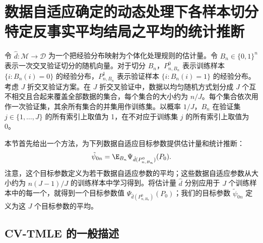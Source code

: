 \section{数据自适应确定的动态处理下各样本切分特定反事实平均结局之平均的统计推断}

令 $\hat d:\mathcal M\to\mathcal D$ 为一个把经验分布映射为个体化处理规则的估计量。令 $B_n\in\{0,1\}^n$ 表示一次交叉验证切分的随机向量。对于切分 $B_n$，$P_{n,B_n}^0$ 表示训练样本 $\{i:B_n(i)=0\}$ 的经验分布，$P_{n,B_n}^1$ 表示验证样本 $\{i:B_n(i)=1\}$ 的经验分布。考虑 $J$ 折交叉验证方案。在 $J$ 折交叉验证中，数据以均匀随机方式划分成 $J$ 个互不相交且合起来覆盖全部数据的集合，每个集合的大小约为 $n/J$。每个集合依次用作一次验证集，其余所有集合的并集用作训练集。以概率 $1/J$，$B_n$ 在验证集 $j\in\{1,\ldots,J\}$ 的所有索引上取值为 1，在不对应于训练集 $j$ 的所有索引上取值为 0。

本节首先给出一个方法，为下列数据自适应目标参数提供估计量和统计推断：
\[
 \tilde\psi_{0n}=\E_{B_n}\Psi_{\hat d(P_{n,B_n}^0)}(P_0).
\]
注意，这个目标参数定义为若干数据自适应参数的平均；这些数据自适应参数从大小约为 $n(J-1)/J$ 的训练样本中学习得到。将估计量 $\hat d$ 分别应用于 $J$ 个训练样本中的每一个，就得到一个目标参数值 $\Psi_{\hat d(P_{n,B_n}^0)}(P_0)$；我们的目标参数 $\tilde\psi_{0n}$ 定义为这 $J$ 个目标参数的平均。

\subsection{CV-TMLE 的一般描述}

